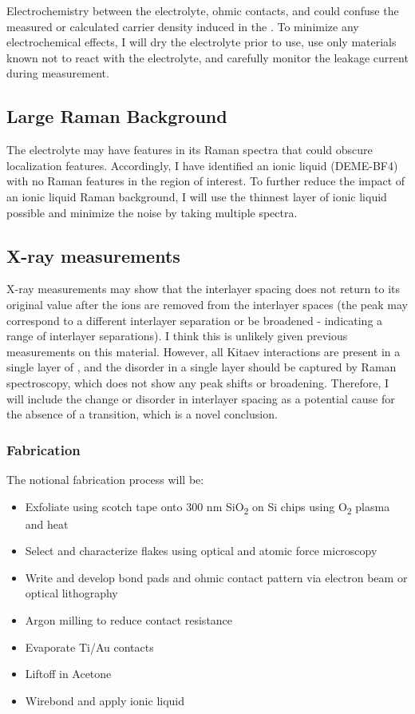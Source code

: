 \documentclass[11pt]{article}
\begin{document}
Electrochemistry between the electrolyte, ohmic contacts, and \rucl could confuse the measured or calculated carrier density induced in the \ruclnospace. To minimize any electrochemical effects, I will dry the electrolyte prior to use, use only materials known not to react with the electrolyte, and carefully monitor the leakage current during measurement.

\subsection{Large Raman Background}

The electrolyte may have features in its Raman spectra that could obscure localization features. Accordingly, I have identified an ionic liquid (DEME-BF4) with no Raman features in the region of interest. To further reduce the impact of an ionic liquid Raman background, I will use the thinnest layer of ionic liquid possible and minimize the noise by taking multiple spectra.

\subsection{X-ray measurements}

X-ray measurements may show that the interlayer spacing does not return to its original value after the ions are removed from the interlayer spaces (the peak may correspond to a different interlayer separation or be broadened - indicating a range of interlayer separations). I think this is unlikely given previous measurements on this material. However, all Kitaev interactions are present in a single layer of \ruclnospace , and the disorder in a single layer should be captured by Raman spectroscopy, which does not show any peak shifts or broadening. Therefore, I will include the change or disorder in interlayer spacing as a potential cause for the absence of a transition, which is a novel conclusion. 

\subsubsection{Fabrication}

The notional fabrication process will be:

\begin{itemize}
	\item Exfoliate \rucl using scotch tape onto 300 nm SiO\textsubscript{2} on Si chips using O\textsubscript{2} plasma and heat
	\item Select and characterize flakes using optical and atomic force microscopy
	\item Write and develop bond pads and ohmic contact pattern via electron beam or optical lithography
	\item Argon milling to reduce contact resistance
	\item Evaporate Ti/Au contacts
	\item Liftoff in Acetone
	\item Wirebond and apply ionic liquid
\end{itemize}
\end{document}

